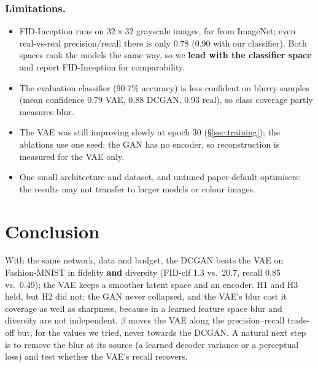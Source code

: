 \documentclass[11pt,letterpaper]{article}
\begin{document}
\FloatBarrier

\subsubsection*{Limitations.}

\begin{itemize}

\item
  FID-Inception runs on \(32 \times 32\) grayscale images, far from
  ImageNet; even real-vs-real precision/recall there is only 0.78 (0.90
  with our classifier). Both spaces rank the models the same way, so we
  \textbf{lead with the classifier space} and report FID-Inception for
  comparability.
\item
  The evaluation classifier (90.7\% accuracy) is less confident on
  blurry samples (mean confidence 0.79 VAE, 0.88 DCGAN, 0.93 real), so
  class coverage partly measures blur.
\item
  The VAE was still improving slowly at epoch 30 (\S\ref{sec:training});
  the ablations use one seed; the GAN has no encoder, so reconstruction
  is measured for the VAE only.
\item
  One small architecture and dataset, and untuned paper-default
  optimisers: the results may not transfer to larger models or colour
  images.
\end{itemize}

\section{Conclusion}\label{sec:conclusion}

With the same network, data and budget, the DCGAN beats the VAE on
Fashion-MNIST in fidelity \textbf{and} diversity (FID-clf 1.3 vs.~20.7,
recall 0.85 vs.~0.49); the VAE keeps a smoother latent space and an
encoder. H1 and H3 held, but H2 did not: the GAN never collapsed, and
the VAE's blur cost it coverage as well as sharpness, because in a
learned feature space blur and diversity are not independent. \(\beta\)
moves the VAE along the precision--recall trade-off but, for the values
we tried, never towards the DCGAN. A natural next step is to remove the
blur at its source (a learned decoder variance or a perceptual loss) and
test whether the VAE's recall recovers.
\end{document}
